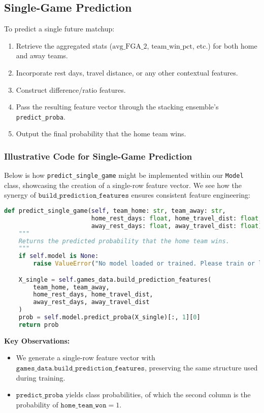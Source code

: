 \documentclass[12pt]{article}
\begin{document}
\subsection{Single-Game Prediction}
To predict a single future matchup:
\begin{enumerate}[label=\roman*)]
    \item Retrieve the aggregated stats (\(\text{avg\_FGA\_2}\), \(\text{team\_win\_pct}\), etc.) for both home and away teams.
    \item Incorporate rest days, travel distance, or any other contextual features.
    \item Construct difference/ratio features.
    \item Pass the resulting feature vector through the stacking ensemble’s \texttt{predict\_proba}.
    \item Output the final probability that the home team wins.
\end{enumerate}

\subsubsection{Illustrative Code for Single-Game Prediction}
Below is how \texttt{predict\_single\_game} might be implemented within our \texttt{Model} class, showcasing the creation of a single-row feature vector. We see how the synergy of \(\texttt{build\_prediction\_features}\) ensures consistent feature engineering:

\begin{lstlisting}[language=Python]
def predict_single_game(self, team_home: str, team_away: str,
                        home_rest_days: float, home_travel_dist: float,
                        away_rest_days: float, away_travel_dist: float) -> float:
    """
    Returns the predicted probability that the home team wins.
    """
    if self.model is None:
        raise ValueError("No model loaded or trained. Please train or load a model first.")

    X_single = self.games_data.build_prediction_features(
        team_home, team_away,
        home_rest_days, home_travel_dist,
        away_rest_days, away_travel_dist
    )
    prob = self.model.predict_proba(X_single)[:, 1][0]
    return prob
\end{lstlisting}

\noindent
\textbf{Key Observations:}
\begin{itemize}
    \item We generate a single-row feature vector with \(\texttt{games\_data.build\_prediction\_features}\), preserving the same structure used during training.
    \item \(\texttt{predict\_proba}\) yields class probabilities, of which the second column is the probability of \(\texttt{home\_team\_won} = 1\).
\end{itemize}
\end{document}
